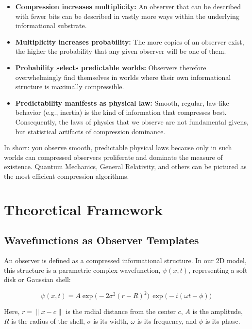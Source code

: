 \documentclass[11pt]{article}
\begin{document}
\begin{itemize}
    \item \textbf{Compression increases multiplicity:} An observer that can be described with fewer bits can be described in vastly more ways within the underlying informational substrate.
    \item \textbf{Multiplicity increases probability:} The more copies of an observer exist, the higher the probability that any given observer will be one of them.
    \item \textbf{Probability selects predictable worlds:} Observers therefore overwhelmingly find themselves in worlds where their own informational structure is maximally compressible.
    \item \textbf{Predictability manifests as physical law:} Smooth, regular, law-like behavior (e.g., inertia) is the kind of information that compresses best. Consequently, the laws of physics that we observe are not fundamental givens, but statistical artifacts of compression dominance.
\end{itemize}

In short: you observe smooth, predictable physical laws because only in such worlds can compressed observers proliferate and dominate the measure of existence. Quantum Mechanics, General Relativity, and others can be pictured as the most efficient compression algorithms.

\section{Theoretical Framework}

\subsection{Wavefunctions as Observer Templates}

An observer is defined as a compressed informational structure. In our 2D model, this structure is a parametric complex wavefunction, $\psi(x,t)$, representing a soft disk or Gaussian shell:

\begin{equation}
\psi(x,t) = A \exp\big(-2\sigma^2 (r - R)^2\big)\,\exp\big(-i(\omega t - \phi)\big)
\end{equation}

Here, $r = \|x - c\|$ is the radial distance from the center $c$, $A$ is the amplitude, $R$ is the radius of the shell, $\sigma$ is its width, $\omega$ is its frequency, and $\phi$ is its phase.
\end{document}
